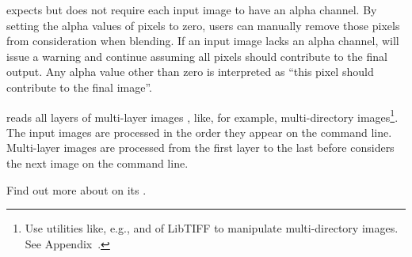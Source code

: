 \App{} expects but does not require each input image to have an alpha
channel.
By setting the alpha values of pixels to zero, users can manually
remove those pixels from consideration when blending.  If an input
image lacks an alpha channel, \App{} will issue a warning and continue
assuming all pixels should contribute to the final output.  Any alpha
value other than zero is interpreted as ``this pixel should contribute
to the final image''.

\App{} reads all layers of multi-layer images%
%
,
like, for example, multi\hyp{}directory%
%
 images\footnote{Use utilities like, e.g.,
   and
   of LibTIFF to manipulate
  multi-directory  images.  See
  Appendix~.}.  The input images are
processed in the order they appear on the command line.  Multi-layer
images are processed from the first layer to the last before \App{}
considers the next image on the command line.

Find out more about \App{} on its
.

